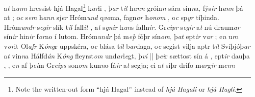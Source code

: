   a\textit{t} h\textit{ann} hressist hjá Hagal\footnote{Note the written-out form \enquote{hjá Hagal} instead of \textit{hjá Hagali} or \textit{hjá Hagli}.}  k\textit{ar}li  , þ\textit{ar} t\textit{il}  h\textit{ann}  gróin\textit{n} sára sin\textit{n}a, fýs\textit{ir} h\textit{ann} þá at  ; 
 o\textit{c} s\textit{em} h\textit{ann} sj\textit{er} Hró\-m\textit{und} q\textit{vo}ma, fagn\textit{ar}  h\textit{onom} , 
 o\textit{c} sp\textit{yr} tíþinda. 
 Hró\-m\textit{undr} s\textit{egir} slík   t\textit{il} fall\textit{it} , a\textit{t} s\textit{ynir} h\textit{an}s   falln\textit{ir}. 
 Gr\textit{eipr} s\textit{egir} a\textit{t} nú    
 draum\textit{ar} sín\textit{ir} hin\textit{ir} f\textit{or}no í   lutom. 
 Hróm\textit{undr}  þá m\textit{eþ} fỏþr sín\textit{om}, þ\textit{at} ept\textit{ir}
v\textit{ar} ; e\textit{n} u\textit{m} v\textit{or}it   Ol\textit{afr} K\textit{óng}r   uppskéra, o\textit{c} blása t\textit{il} b\textit{ar}daga,
o\textit{c} segist vilja aptr t\textit{il} Svíþjóþ\textit{ar} a\textit{t}
vin\textit{n}a  Hálfd\textit{án} K\textit{óng}  fleyrst\textit{om} und\textit{ar}l\textit{e}gt, þ\textit{ví}  || þ\textit{ei}r   sættost sín á , 
ept\textit{ir} dauþa ,  , 
e\textit{n} af þ\textit{ei}m Gr\textit{eips} son\textit{om} kun\textit{n}o  fá\textit{ir} a\textit{t} segja;   ei a\textit{t} síþr drifo   m\textit{ar}g\textit{ir} m\textit{enn}
